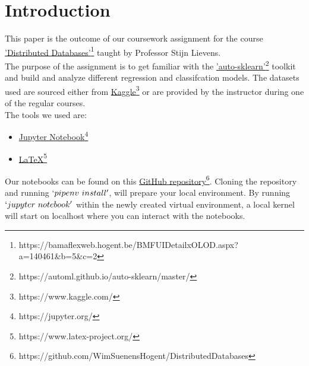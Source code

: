 
\chapter{Introduction}
\newcommand{\linkCourse}{https://bamaflexweb.hogent.be/BMFUIDetailxOLOD.aspx?a=140461&b=5&c=2}
\newcommand{\linkAutoSklearn}{https://automl.github.io/auto-sklearn/master/}
\newcommand{\linkKaggle}{https://www.kaggle.com/}
\newcommand{\linkJupyter}{https://jupyter.org/}
\newcommand{\linkLatex}{https://www.latex-project.org/}
\newcommand{\linkGithubRepo}{https://github.com/WimSuenensHogent/DistributedDatabases}

This paper is the outcome of our coursework assignment for the course \href{\linkCourse}{'Distributed Databases'\footnote{\url{\linkCourse}}} taught by Professor Stijn Lievens.
\\

The purpose of the assignment is to get familiar with the \href{\linkAutoSklearn}{'auto-sklearn'\footnote{\url{\linkAutoSklearn}}} toolkit and build and analyze different regression and classifcation models. The datasets used are sourced either from \href{\linkKaggle}{Kaggle\footnote{\url{\linkKaggle}}} or are provided by the instructor during one of the regular courses.
\\

The tools we used are:
\begin{itemize}
  \item \href{\linkJupyter}{Jupyter Notebook\footnote{\url{\linkJupyter}}}
  \item \href{\linkLatex}{\LaTeX{}\footnote{\url{\linkLatex}}}
\end{itemize}

Our notebooks can be found on this \href{\linkGithubRepo}{GitHub repository\footnote{\url{\linkGithubRepo}}}. Cloning the repository and running $`pipenv\ install'$, will prepare your local environment. By running $`jupyter\ notebook'$ within the newly created virtual environment, a local kernel will start on localhost where you can interact with the notebooks.
